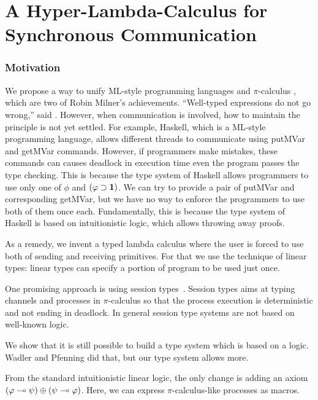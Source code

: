 \chapter{A Hyper-Lambda-Calculus for Synchronous Communication}
\label{ch:exchange}

\subsection{Motivation}

We propose a way to unify ML-style programming languages  and
$\pi$-calculus , which are two of Robin Milner's achievements.
``Well-typed expressions do not go wrong,'' said \citet{milner1978}.
However, when communication is involved, how to maintain the principle
is not yet settled.
For example, Haskell, which is a ML-style programming language,
allows different threads to communicate using
putMVar and getMVar commands.
However, if programmers make mistakes, these commands can
causes deadlock in execution time even the program passes the type checking.
This is because the type system of Haskell allows programmers to
use only one of $\phi$ and $(\varphi\supset \mathbf{1})$.
We can try to provide a pair of putMVar and corresponding getMVar,
but we have no way to enforce the programmers to use both of them once
each.
Fundamentally, this is because the type system of Haskell
is based on intuitionistic logic, which allows throwing away proofs.


As a remedy, we invent a typed lambda calculus where
the user is forced to use both of sending and receiving primitives.
For that we use the technique of linear types:
linear types can specify a portion of program to be used
just once.

One promising approach is using session types~\citep{honda-session}.
Session types aims at typing channels and processes in $\pi$-calculus so
that the process execution is deterministic and not ending in deadlock.
In general session type systems are not based on well-known logic.

We show that it is still possible to build
a type system which is based on a logic.
Wadler and Pfenning did that, but our type system allows more.

From the standard intuitionistic linear logic,
the only change is adding an axiom
$(\varphi\multimap\psi)\oplus(\psi\multimap\varphi)$.
Here, we can express $\pi$-calculus-like processes as macros.

